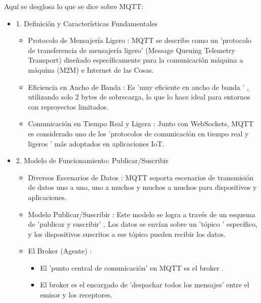 \documentclass{report}
\begin{document}
Aquí se desglosa lo que se  dice sobre MQTT:
\begin{itemize}
    \item 1. Definición y Características Fundamentales
    \begin{itemize}
        \item Protocolo de Mensajería Ligero : MQTT se describe como un   'protocolo de transferencia de mensajería ligero'  
        (Message Queuing Telemetry Transport) diseñado específicamente para la comunicación máquina a máquina (M2M) e Internet de las Cosas.
        \item Eficiencia en Ancho de Banda : Es   'muy eficiente en ancho de banda ' , utilizando solo 2 bytes de sobrecarga, lo que lo hace 
        ideal para entornos con reproyectos limitados.
        \item Comunicación en Tiempo Real y Ligera : Junto con WebSockets, MQTT es considerado uno de los 'protocolos de comunicación en tiempo real 
        y ligeros '  más adoptados en aplicaciones IoT.
    \end{itemize}

    \item 2. Modelo de Funcionamiento: Publicar/Suscribir
    \begin{itemize}
        \item Diversos Escenarios de Datos : MQTT soporta escenarios de transmisión de datos  uno a uno, uno a muchos y muchos a muchos  para 
        dispositivos y aplicaciones.
        \item Modelo Publicar/Suscribir : Este modelo se logra a través de un esquema de   'publicar y suscribir' . Los datos se envían sobre un  
        'tópico ' específico, y los dispositivos suscritos a ese tópico pueden recibir los datos.
        \item El Broker (Agente) :
        \begin{itemize}
            \item El 'punto central de comunicación' en MQTT es el  broker .
            \item El broker es el encargado de 'despachar todos los mensajes'  entre el emisor y los receptores.
        \end{itemize}
        

\end{itemize}
\end{itemize}
\end{document}
